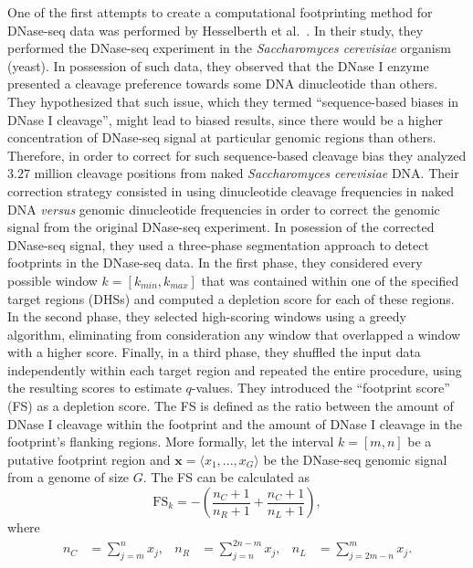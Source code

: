 One of the first attempts to create a computational footprinting method for DNase-seq data was performed by Hesselberth et al.~\cite{hesselberth2009}. In their study, they performed the DNase-seq experiment in the \emph{Saccharomyces cerevisiae} organism (yeast). In possession of such data, they observed that the DNase I enzyme presented a cleavage preference towards some DNA dinucleotide than others. They hypothesized that such issue, which they termed ``sequence-based biases in DNase I cleavage'', might lead to biased results, since there would be a higher concentration of DNase-seq signal at particular genomic regions than others. Therefore, in order to correct for such sequence-based cleavage bias they analyzed $3.27$ million cleavage positions from naked \emph{Saccharomyces cerevisiae} DNA. Their correction strategy consisted in using dinucleotide cleavage frequencies in naked DNA \emph{versus} genomic dinucleotide frequencies in order to correct the genomic signal from the original DNase-seq experiment. In posession of the corrected DNase-seq signal, they used a three-phase segmentation approach to detect footprints in the DNase-seq data. In the first phase, they considered every possible window $k = [k_{min},k_{max}]$ that was contained within one of the specified target regions (DHSs) and computed a depletion score for each of these regions. In the second phase, they selected high-scoring windows using a greedy algorithm, eliminating from consideration any window that overlapped a window with a higher score. Finally, in a third phase, they shuffled the input data independently within each target region and repeated the entire procedure, using the resulting scores to estimate $q$-values. They introduced the ``footprint score'' (FS) as a depletion score. The FS is defined as the ratio between the amount of DNase I cleavage within the footprint and the amount of DNase I cleavage in the footprint's flanking regions. More formally, let the interval ${k} = [{m},{n}]$ be a putative footprint region and $\mathbf{x} = \langle  x_1, ..., x_G\rangle$ be the DNase-seq genomic signal from a genome of size $G$. The FS can be calculated as 
\begin{equation}
  \label{eq:fs1}
  \text{FS}_{k} = -\left(\frac{{n}_{C}+1}{{n}_{R}+1} + \frac{{n}_{C}+1}{{n}_{L}+1}\right),
\end{equation}
where
\begin{align}
  \label{eq:fs2}
  {n}_{C} &= \sum_{j=m}^{n} {x}_{j}, &
  {n}_{R} &= \sum_{j=n}^{2n-m} {x}_{j}, &
  {n}_{L} &= \sum_{j=2m-n}^{m} {x}_{j}.
\end{align}

